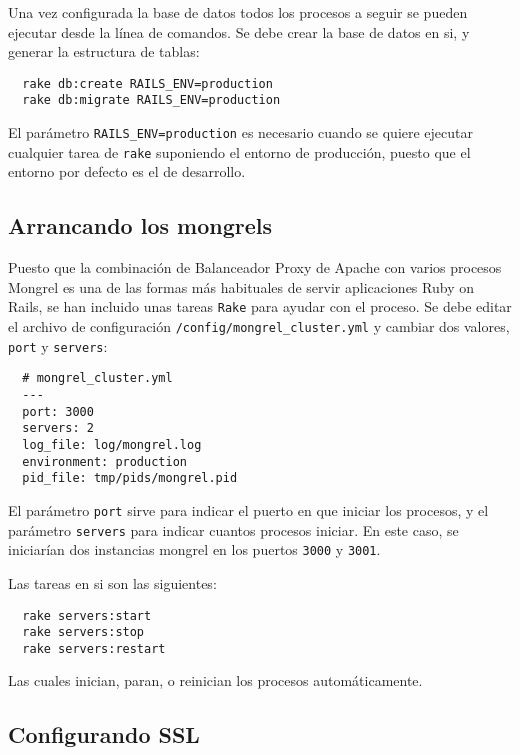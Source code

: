 Una vez configurada la base de datos todos los procesos a seguir se pueden ejecutar desde la línea de comandos. Se debe crear la base de datos en si, y generar la estructura de tablas:

\begin{verbatim}
  rake db:create RAILS_ENV=production
  rake db:migrate RAILS_ENV=production
\end{verbatim}

El parámetro \texttt{RAILS\_ENV=production} es necesario cuando se quiere ejecutar cualquier tarea de \texttt{rake} suponiendo el entorno de producción, puesto que el entorno por defecto es el de desarrollo.


\subsection{Arrancando los mongrels} %
\label{sub:arrancando_los_mongrels}

Puesto que la combinación de Balanceador Proxy de Apache con varios procesos Mongrel es una de las formas más habituales de servir aplicaciones Ruby on Rails, se han incluido unas tareas \texttt{Rake} para ayudar con el proceso. Se debe editar el archivo de configuración \texttt{/config/mongrel\_cluster.yml} y cambiar dos valores, \texttt{port} y \texttt{servers}:

\begin{verbatim}
  # mongrel_cluster.yml
  --- 
  port: 3000
  servers: 2
  log_file: log/mongrel.log
  environment: production
  pid_file: tmp/pids/mongrel.pid  
\end{verbatim}

El parámetro \texttt{port} sirve para indicar el puerto en que iniciar los procesos, y el parámetro \texttt{servers} para indicar cuantos procesos iniciar. En este caso, se iniciarían dos instancias mongrel en los puertos \texttt{3000} y \texttt{3001}.

Las tareas en si son las siguientes:

\begin{verbatim}
  rake servers:start
  rake servers:stop
  rake servers:restart
\end{verbatim}

Las cuales inician, paran, o reinician los procesos automáticamente.


\subsection{Configurando SSL} %
\label{sub:configurando_ssl}

